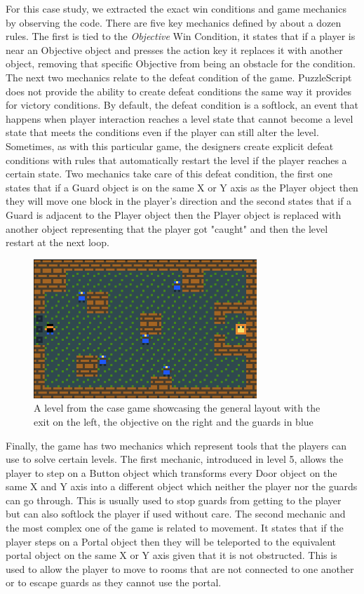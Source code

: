 For this case study, we extracted the exact win conditions and game mechanics by observing the code. There are five key mechanics defined by about a dozen rules. The first is tied to the \textit{Objective} Win Condition, it states that if a player is near an Objective object and presses the action key it replaces it with another object, removing that specific Objective from being an obstacle for the condition. The next two mechanics relate to the defeat condition of the game. PuzzleScript does not provide the ability to create defeat conditions the same way it provides for victory conditions. By default, the defeat condition is a softlock, an event that happens when player interaction reaches a level state that cannot become a level state that meets the conditions even if the player can still alter the level. Sometimes, as with this particular game, the designers create explicit defeat conditions with rules that automatically restart the level if the player reaches a certain state. Two mechanics take care of this defeat condition, the first one states that if a Guard object is on the same X or Y axis as the Player object then they will move one block in the player's direction and the second states that if a Guard is adjacent to the Player object then the Player object is replaced with another object representing that the player got "caught" and then the level restart at the next loop.

\begin{figure}[!t]
    \centering
    \includegraphics[width=0.75\textwidth]{images/case_results/Case_game.png}
    \caption{A level from the case game showcasing the general layout with the exit on the left, the objective on the right and the guards in blue}
    \label{fig:case_game_example_old}
\end{figure}

Finally, the game has two mechanics which represent tools that the players can use to solve certain levels. The first mechanic, introduced in level 5, allows the player to step on a Button object which transforms every Door object on the same X and Y axis into a different object which neither the player nor the guards can go through. This is usually used to stop guards from getting to the player but can also softlock the player if used without care. The second mechanic and the most complex one of the game is related to movement. It states that if the player steps on a Portal object then they will be teleported to the equivalent portal object on the same X or Y axis given that it is not obstructed. This is used to allow the player to move to rooms that are not connected to one another or to escape guards as they cannot use the portal.

